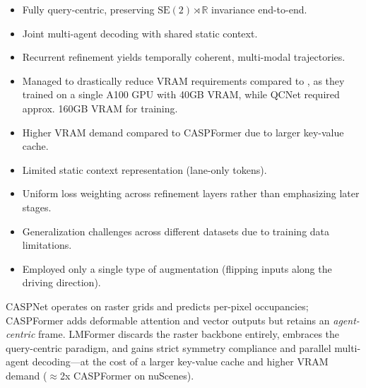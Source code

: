 \begin{itemize}[leftmargin=*, label=\greenoplus]
  \item Fully query-centric, preserving \(\mathrm{SE}(2)\!\rtimes\!\mathbb{R}\) invariance end-to-end.
  \item Joint multi-agent decoding with shared static context.
  \item Recurrent refinement yields temporally coherent, multi-modal trajectories.
  \item Managed to drastically reduce VRAM requirements compared to \cite{qcnetZhou2023}, as they trained on a single A100 GPU with 40GB VRAM, while QCNet required approx. 160GB VRAM for training.
\end{itemize}

\begin{itemize}[leftmargin=*, label=\redominus]
  \item Higher VRAM demand compared to CASPFormer due to larger key-value cache.
  \item Limited static context representation (lane-only tokens).
  \item Uniform loss weighting across refinement layers rather than emphasizing later stages.
  \item Generalization challenges across different datasets due to training data limitations.
  \item Employed only a single type of augmentation (flipping inputs along the driving direction).
\end{itemize}

CASPNet operates on raster grids and predicts per-pixel occupancies; CASPFormer adds deformable attention and vector outputs but retains an \emph{agent-centric} frame. LMFormer discards the raster backbone entirely, embraces the query-centric paradigm, and gains strict symmetry compliance and parallel multi-agent decoding—at the cost of a larger key-value cache and higher VRAM demand (\(\approx\)2x CASPFormer on nuScenes).

\newpage


